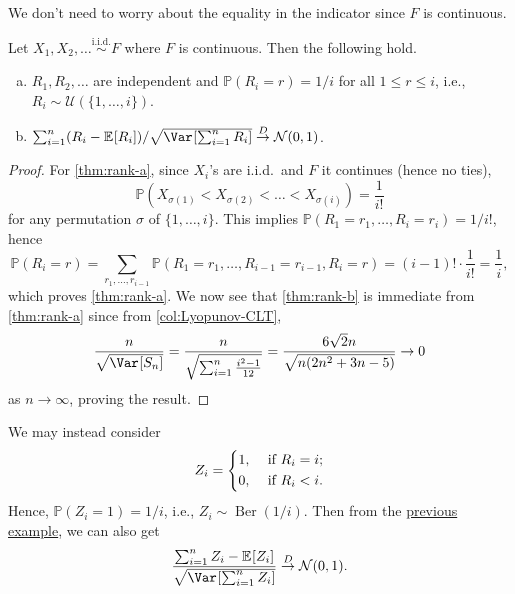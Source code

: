 \begin{note}
	We don't need to worry about the equality in the indicator since \(F\) is continuous.
\end{note}

\begin{theorem}\label{thm:rank}
	Let \(X_1, X_2 , \dots \overset{\text{i.i.d.} }{\sim } F\) where \(F\) is continuous. Then the following hold.
	\begin{enumerate}[(a)]
		\item\label{thm:rank-a} \(R_1, R_2, \dots \) are independent and \(\mathbb{P} (R_i = r) = 1 / i\) for all \(1 \leq r \leq i\), i.e., \(R_i \sim \mathcal{U} (\{ 1, \dots , i \} )\).
		\item\label{thm:rank-b} \(\sum_{i=1}^{n} (R_i - \mathbb{E}_{}[R_i] ) / \sqrt{\Var_{}[\sum_{i=1}^{n} R_i] } \overset{D}{\to} \mathcal{N} (0, 1)\).
	\end{enumerate}
\end{theorem}
\begin{proof}
	For \autoref{thm:rank-a}, since \(X_i\)'s are i.i.d.\ and \(F\) it continues (hence no ties),
	\[
		\mathbb{P} (X_{\sigma (1)} < X_{\sigma (2)} < \dots < X_{\sigma (i)})
		= \frac{1}{i!}
	\]
	for any permutation \(\sigma \) of \(\{ 1, \dots , i \} \). This implies \(\mathbb{P} (R_1 = r_1, \dots , R_i = r_i) = 1 / i!\), hence
	\[
		\mathbb{P} (R_i = r)
		= \sum_{r_1, \dots , r_{i-1}} \mathbb{P} (R_1 = r_1 , \dots , R_{i-1} = r_{i-1} , R_i = r)
		= (i - 1)! \cdot \frac{1}{i!}
		= \frac{1}{i},
	\]
	which proves \autoref{thm:rank-a}. We now see that \autoref{thm:rank-b} is immediate from \autoref{thm:rank-a} since from \autoref{col:Lyopunov-CLT},
	\[
		\frac{n}{\sqrt{\Var_{}[S_n] }}
		= \frac{n}{\sqrt{\sum_{i=1}^{n} \frac{i^2 - 1}{12}}}
		= \frac{6 \sqrt{2} n}{\sqrt{n (2 n^{2} + 3 n - 5)}}
		\to 0
	\]
	as \(n \to \infty \), proving the result.
\end{proof}

\begin{remark}
	We may instead consider
	\[
		Z_i = \begin{dcases}
			1, & \text{ if } R_i = i ; \\
			0, & \text{ if } R_i < i .
		\end{dcases}
	\]
	Hence, \(\mathbb{P} (Z_i = 1) = 1 / i\), i.e., \(Z_i \sim \operatorname{Ber}(1 / i) \). Then from the \hyperref[eg:Lyopunov-CLT]{previous example}, we can also get
	\[
		\frac{\sum_{i=1}^{n} Z_i - \mathbb{E}_{}[Z_i] }{\sqrt{\Var_{}[\sum_{i=1}^{n} Z_i] } }
		\overset{D}{\to} \mathcal{N} (0, 1).
	\]
\end{remark}

